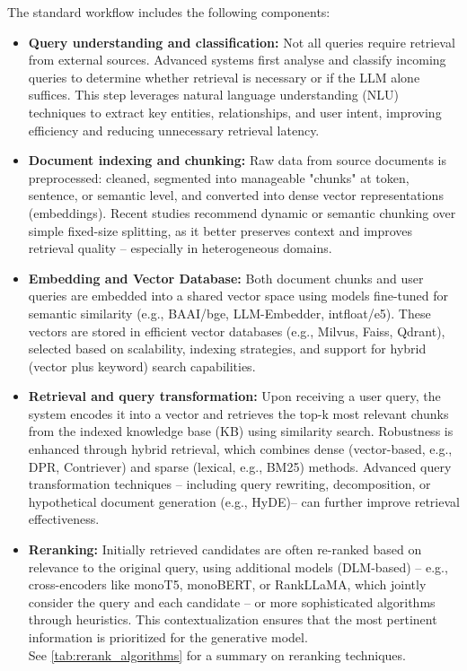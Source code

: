 \begin{spacing}{1.5}
The standard workflow includes the following components:
\begin{itemize}
  \item \textbf{Query understanding and classification:} Not all queries require retrieval from external sources. Advanced systems first analyse and classify incoming queries to determine whether retrieval is necessary or if the LLM alone suffices. This step leverages natural language understanding (NLU) techniques to extract key entities, relationships, and user intent, improving efficiency and reducing unnecessary retrieval latency.
    \item \textbf{Document indexing and chunking:} Raw data from source documents is preprocessed: cleaned, segmented into manageable "chunks" at token, sentence, or semantic level, and converted into dense vector representations (embeddings). Recent studies recommend dynamic or semantic chunking over simple fixed-size splitting, as it better preserves context and improves retrieval quality -- especially in heterogeneous domains.
    \item \textbf{Embedding and Vector Database:} Both document chunks and user queries are embedded into a shared vector space using models fine-tuned for semantic similarity (e.g., BAAI/bge, LLM-Embedder, intfloat/e5). These vectors are stored in efficient vector databases (e.g., Milvus, Faiss, Qdrant), selected based on scalability, indexing strategies, and support for hybrid (vector plus keyword) search capabilities.
    \item \textbf{Retrieval and query transformation:} Upon receiving a user query, the system encodes it into a vector and retrieves the top-k most relevant chunks from the indexed knowledge base (KB) using similarity search. Robustness is enhanced through hybrid retrieval, which combines dense (vector-based, e.g., DPR, Contriever) and sparse (lexical, e.g., BM25) methods. Advanced query transformation techniques -- including query rewriting, decomposition, or hypothetical document generation (e.g., HyDE)-- can further improve retrieval effectiveness.
    \item \textbf{Reranking:} Initially retrieved candidates are often re-ranked based on relevance to the original query, using additional models (DLM-based) -- e.g., cross-encoders like monoT5, monoBERT, or RankLLaMA, which jointly consider the query and each candidate -- or more sophisticated algorithms through heuristics. This contextualization ensures that the most pertinent information is prioritized for the generative model.\\See \autoref{tab:rerank_algorithms} for a summary on reranking techniques.

\end{itemize}
\end{spacing}
